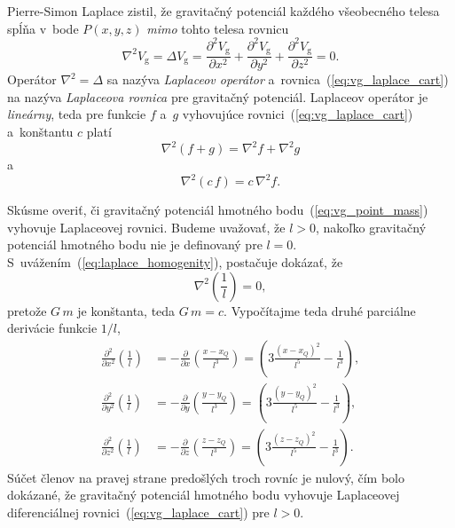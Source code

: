 \documentclass[a4paper, 12pt]{book}
\newcommand{\gidx}{\mathrm g}
\begin{document}
Pierre-Simon Laplace zistil, že gravitačný potenciál každého všeobecného telesa 
spĺňa v~bode $P(x, y, z)$ \emph{mimo} tohto telesa rovnicu
%
\begin{equation}
\label{eq:vg_laplace_cart}
\nabla^2 V_\gidx = \Delta V_\gidx = \frac{\partial^2 V_\gidx}{\partial x^2}
+ \frac{\partial^2 V_\gidx}{\partial y^2} + \frac{\partial^2 V_\gidx}{\partial 
z^2} = 0{.}
\end{equation}
%
Operátor $\nabla^2 = \Delta$ sa nazýva \emph{Laplaceov operátor} 
a~rovnica~(\ref{eq:vg_laplace_cart}) na nazýva \emph{Laplaceova rovnica} pre 
gravitačný potenciál.  Laplaceov operátor je \emph{lineárny}, teda pre funkcie 
$f$ a~$g$ vyhovujúce rovnici~(\ref{eq:vg_laplace_cart}) a~konštantu $c$ platí
%
\begin{equation}
\label{eq:laplace_additivity}
\nabla^2 \left(f + g \right) = \nabla^2 f + \nabla^2 g
\end{equation}
%
a
%
\begin{equation}
\label{eq:laplace_homogenity}
\nabla^2 (c \, f) = c \, \nabla^2 f{.}
\end{equation}

Skúsme overiť, či gravitačný potenciál hmotného bodu~(\ref{eq:vg_point_mass}) 
vyhovuje Laplaceovej rovnici.  Budeme uvažovať, že $l > 0$, nakoľko gravitačný 
potenciál hmotného bodu nie je definovaný pre $l = 0$.  
S~uvážením~(\ref{eq:laplace_homogenity}), postačuje dokázať, že
%
\begin{equation}
\label{eq:nabla_l}
\nabla^2 \left( \frac{1}{l} \right) = 0{,}
\end{equation}
%
pretože $G \, m$ je konštanta, teda $G \, m = c$.  Vypočítajme teda druhé 
parciálne derivácie funkcie $1 \slash l$,
%
\begin{equation}
\label{eq:l_2nd_derivatives}
\begin{split}
\frac{\partial^2}{\partial x^2} \left( \frac{1}{l} \right) &= 
-\frac{\partial}{\partial x} \left( \frac{x - x_Q}{l^3} \right) = \left(3 
\frac{(x - x_Q)^2}{l^5} - \frac{1}{l^3} \right){,}\\
%
\frac{\partial^2}{\partial y^2} \left( \frac{1}{l} \right) &= 
-\frac{\partial}{\partial y} \left( \frac{y - y_Q}{l^3} \right) = \left(3 
\frac{(y - y_Q)^2}{l^5} - \frac{1}{l^3} \right){,}\\
%
\frac{\partial^2}{\partial z^2} \left( \frac{1}{l} \right) &= 
-\frac{\partial}{\partial z} \left( \frac{z - z_Q}{l^3} \right) = \left(3 
\frac{(z - z_Q)^2}{l^5} - \frac{1}{l^3} \right){.}
\end{split}
\end{equation}
%
Súčet členov na pravej strane predošlých troch rovníc je nulový, čím bolo 
dokázané, že gravitačný potenciál hmotného bodu vyhovuje Laplaceovej 
diferenciálnej rovnici~(\ref{eq:vg_laplace_cart}) pre $l > 0$.
\end{document}
